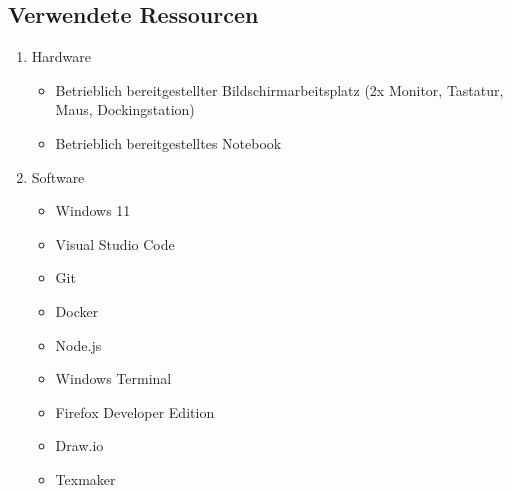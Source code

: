 \subsection{Verwendete Ressourcen}
\label{sec:Anhang:VerwendeteRessourcen}

\begin{enumerate}
    \item Hardware \\
    \begin{itemize}
        \item Betrieblich bereitgestellter Bildschirmarbeitsplatz (2x Monitor, Tastatur, Maus, Dockingstation)
        \item Betrieblich bereitgestelltes Notebook
    \end{itemize}
    \item Software \\
    \begin{itemize}
        \item Windows 11
        \item Visual Studio Code
        \item Git
        \item Docker
        \item Node.js
        \item Windows Terminal
        \item Firefox Developer Edition
        \item Draw.io
        \item Texmaker
    \end{itemize}
\end{enumerate}
